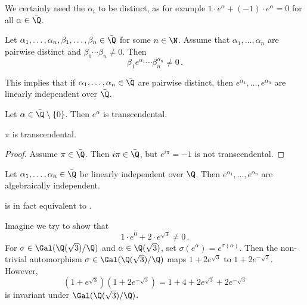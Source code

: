 We certainly need the \( \alpha_i \) to be distinct, as for example \( 1 \cdot e^\alpha + (-1) \cdot e^\alpha = 0 \) for all \( \alpha \in \bar{\Q} \).

\begin{thmn}\label{thm:4.15}
	Let \( \alpha_1, \dotsc, \alpha_n, \beta_1, \dotsc, \beta_n \in \bar{\Q} \) for some \( n \in \N \).
	Assume that \( \alpha_1, \dotsc, \alpha_n \) are pairwise distinct and \( \beta_1 \dotsm \beta_n \neq 0 \).
	Then
	\[ \beta_1 e^{\alpha_1} \dotsm \beta_n^{\alpha_n} \neq 0 \,. \]
\end{thmn}

\begin{rem*}
	This implies that if \( \alpha_1, \dotsc, \alpha_n \in \bar{\Q} \) are pairwise distinct, then \( e^{\alpha_1}, \dotsc, e^{\alpha_n} \) are linearly independent over \( \bar{\Q} \).
\end{rem*}

\begin{cor}
	Let \( \alpha \in \bar{\Q} \setminus \{0\} \).
	Then \( e^\alpha \) is transcendental.
\end{cor}

\begin{cor}
	\( \pi \) is transcendental.
\end{cor}

\begin{proof}
	Assume \( \pi \in \bar{\Q} \).
	Then \( i \pi \in \bar{\Q} \), but \( e^{i\pi} = -1 \) is not transcendental.
\end{proof}

\begin{cor}\label{thm:4.18}
	Let \( \alpha_1, \dotsc, \alpha_n \in \bar{\Q} \) be linearly independent over \( \Q \).
	Then \( e^{\alpha_1}, \dotsc, e^{\alpha_n} \) are algebraically independent.
\end{cor}

\begin{rem*}
	 is in fact equivalent to .
\end{rem*}

\begin{exmp*}
	Imagine we try to show that
	\[ 1 \cdot e^0 + 2 \cdot e^{\sqrt{3}} \neq 0 \,. \]
	For \( \sigma \in \Gal(\Q(\sqrt{3})/\Q) \) and \( \alpha \in \Q(\sqrt{3}) \), set \( \sigma(e^\alpha) = e^{\sigma(\alpha)} \).
	Then the non-trivial automorphism \( \sigma \in \Gal(\Q(\sqrt{3})/\Q) \) maps \( 1+2e^{\sqrt{3}} \) to \( 1+2e^{-\sqrt{3}} \).
	However,
	\[ \left( 1 + e^{\sqrt{3}} \right) \left( 1 + 2e^{-\sqrt{3}} \right) = 1+4 + 2e^{\sqrt{3}} + 2e^{-\sqrt{3}} \]
	is invariant under \( \Gal(\Q(\sqrt{3})/\Q) \).
\end{exmp*}

